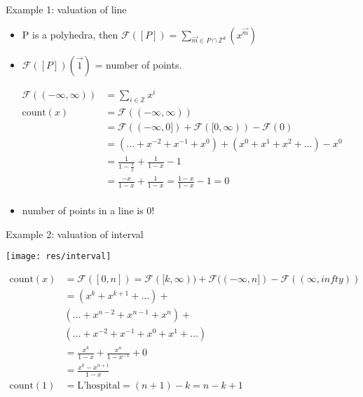 \documentclass[8pt]{beamer}
\begin{document}
\begin{frame}[label=sec-3]{Example 1: valuation of line}
\begin{itemize}
\item P is a polyhedra, then $\mathcal{F}([P]) = \sum_{\vec{m} \in P \cap \mathbb{Z}^d} (x^{\vec{m}} )$
\item $\mathcal{F}([P])(\vec 1)$ = number of points.
\end{itemize}
\begin{align*}
\mathcal{F}((-\infty, \infty)) &= \sum_{i \in \mathbb{Z}} x^i \\
\text{count}(x) &= \mathcal{F}((-\infty, \infty)) \\
                &= \mathcal{F}((-\infty, 0]) + \mathcal{F}([0, \infty))  - \mathcal{F}(0) \\ 
                &=( \ldots + x^{-2} + x^{-1} + x^0) + (x^0 + x^1 + x^2 + \ldots) - x^0 \\
                &= \frac{1}{1 - \frac{1}{x}} + \frac{1}{1 - x} - 1 \\ 
                &= \frac{-x}{1 - x} + \frac{1}{1 - x}  = \frac{1 - x}{1 - x} - 1 = 0 \\
\end{align*}

\begin{itemize}
\item number of points in a line is 0!
\end{itemize}
\end{frame}
\begin{frame}[label=sec-4]{Example 2: valuation of interval}
\begin{center}
 \texttt{[image: res/interval]}
\end{center}

\begin{align*}
\text{count}(x) &= \mathcal{F}([0, n]) = \mathcal{F}([k, \infty)) + \mathcal{F}((-\infty, n]) - \mathcal{F}((\infty, infty)) \\
                &= (x^k + x^{k + 1} + \ldots) + \\
                & (\ldots +  x^{n - 2} + x^{n - 1} + x^n) +  \\
                & (\ldots + x^{-2} + x^{-1} + x^0 + x^1 + \ldots) \\
                &= \frac{x^k}{1 - x} + \frac{x^n}{1 - x^{-1}} + 0 \\
                &= \frac{x^k - x^{n + 1}}{1 - x} \\
\text{count}(1) &= \text{L'hospital} = (n + 1) - k = n - k + 1
\end{align*}
\end{frame}
\end{document}
